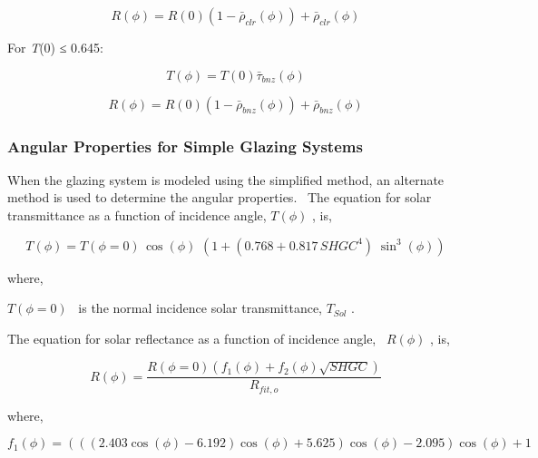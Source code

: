 \begin{equation}
R(\phi ) = R(0)(1 - {\bar \rho_{clr}}(\phi )) + {\bar \rho_{clr}}(\phi )
\end{equation}

For \emph{T}(0) ≤ 0.645:

\begin{equation}
T(\phi ) = T(0){\bar \tau_{bnz}}(\phi )
\end{equation}

\begin{equation}
R(\phi ) = R(0)(1 - {\bar \rho_{bnz}}(\phi )) + {\bar \rho_{bnz}}(\phi )
\end{equation}

\subsubsection{Angular Properties for Simple Glazing Systems}\label{angular-properties-for-simple-glazing-systems}

When the glazing system is modeled using the simplified method, an alternate method is used to determine the angular properties.~ The equation for solar transmittance as a function of incidence angle, \(T\left( \phi \right)\) , is,

\begin{equation}
T\left( \phi  \right) = T\left( {\phi  = 0} \right)\,\cos \left( \phi  \right)\,\,\left( {1 + (0.768 + 0.817\,SHG{C^4})\;{{\sin }^3}\left( \phi  \right)} \right)
\end{equation}

where,

\(T\left( {\phi = 0} \right)\) ~is the normal incidence solar transmittance, \({T_{Sol}}\) .

The equation for solar reflectance as a function of incidence angle,~ \(R\left( \phi \right)\) , is,

\begin{equation}
R\left( \phi  \right) = \frac{{R\left( {\phi  = 0} \right)\left( {{f_1}\left( \phi  \right) + {f_2}\left( \phi  \right)\sqrt {SHGC} } \right)}}{{{R_{fit,o}}}}
\end{equation}

where,

\begin{equation}
{f_1}\left( \phi  \right) = \left( {\left( {\left( {2.403\cos \left( \phi  \right) - 6.192} \right)\cos \left( \phi  \right) + 5.625} \right)\cos \left( \phi  \right) - 2.095} \right)\cos \left( \phi  \right) + 1
\end{equation}

